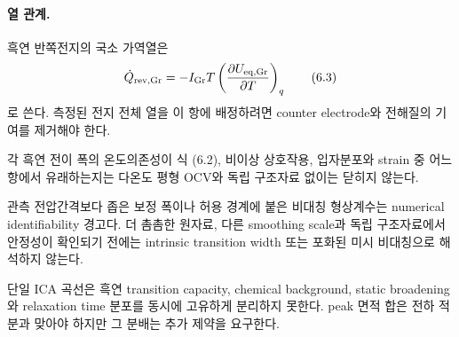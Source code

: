 \paragraph{ 열 관계.}
흑연 반쪽전지의 국소 가역열은
\[
 \dot Q_{\mathrm{rev},\mathrm{Gr}}
 =-I_{\mathrm{Gr}}T
 \left(\frac{\partial U_{\mathrm{eq},\mathrm{Gr}}}{\partial T}\right)_q
 \tag{6.3}
\]
로 쓴다. 측정된 전지 전체 열을 이 항에 배정하려면 counter
electrode와 전해질의 기여를 제거해야 한다.

\begin{openitem}
각 흑연 전이 폭의 온도의존성이 식 (6.2), 비이상 상호작용,
입자분포와 strain 중 어느 항에서 유래하는지는 다온도 평형 OCV와
독립 구조자료 없이는 닫히지 않는다.
\end{openitem}

\begin{openitem}
관측 전압간격보다 좁은 보정 폭이나 허용 경계에 붙은 비대칭
형상계수는 numerical identifiability 경고다. 더 촘촘한 원자료,
다른 smoothing scale과 독립 구조자료에서 안정성이 확인되기 전에는
intrinsic transition width 또는 포화된 미시 비대칭으로 해석하지
않는다.
\end{openitem}

\begin{identifiability}
단일 ICA 곡선은 흑연 transition capacity, chemical background,
static broadening와 relaxation time 분포를 동시에 고유하게
분리하지 못한다. peak 면적 합은 전하 적분과 맞아야 하지만 그
분배는 추가 제약을 요구한다.
\end{identifiability}

